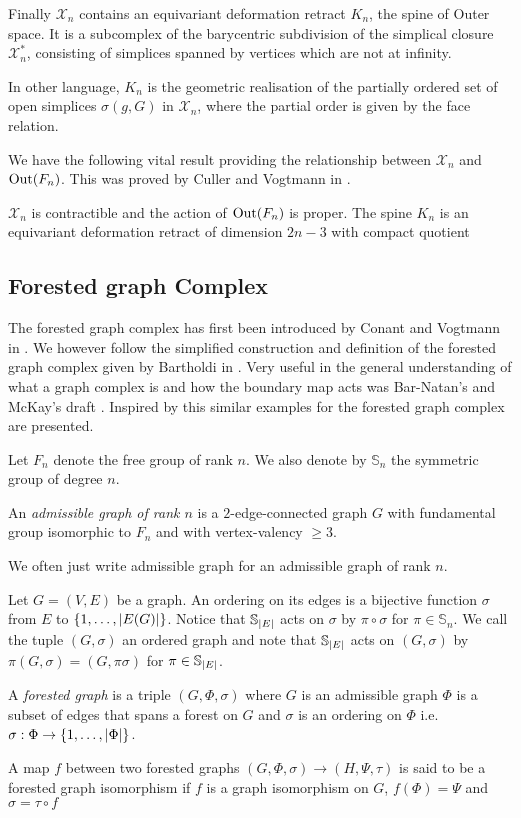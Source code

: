  Finally $\mathcal{X}_{n}$ contains an equivariant deformation retract $K_{n}$, the spine of Outer space.
 It is a subcomplex of the barycentric subdivision of the simplical closure $\mathcal{X}_{n}^{*}$, consisting of simplices spanned by vertices which are not at infinity.

 In other language, $K_{n}$ is the geometric realisation of the partially ordered set of open simplices $\sigma(g,G)$ in $\mathcal{X}_{n}$, where 
 the partial order is given by the face relation.

 We have the following vital result providing the relationship between $\mathcal{X}_{n}$ and $\operatorname{Out}(F_{n})$. This was proved by Culler and Vogtmann in \cite{vogtmann86}.
 \begin{theorem}
	 $\mathcal{X}_{n}$ is contractible and the action of $\operatorname{Out}(F_{n})$ is proper.
	 The spine $K_{n}$ is an equivariant deformation retract of dimension $2 n - 3$ with compact quotient
 \end{theorem}

\subsection{Forested graph Complex}
The forested graph complex has first been introduced by Conant and Vogtmann in \cite{conant03}.
We however follow the simplified construction and definition of the forested graph complex given by Bartholdi in \cite{bartholdi16}.
Very useful in the general understanding of  what a graph complex is and how the boundary map acts was Bar-Natan's and McKay's draft \cite{natan01}.
Inspired by this similar examples for the forested graph complex are presented.

Let $F_{n}$ denote the free group of rank $n$. We also denote by $\mathbb{S}_{n}$ the symmetric group of degree $n$.
\begin{definition}
	An \emph{admissible graph of rank $n$} is a $2$-edge-connected graph $G$ with fundamental group isomorphic to $F_{n}$ and with vertex-valency $\geq 3$.
\end{definition}

We often just write admissible graph for an admissible graph of rank $n$.

\begin{definition}
	Let $G = (V,E)$ be a graph. An ordering on its edges is a bijective function $\sigma$ from $E$ to $\{1,\ldots,\abs{E(G)}\}$.
	Notice that $\mathbb{S}_{\abs{E}}$ acts on $\sigma$ by $\pi \circ \sigma$ for $\pi \in \mathbb{S}_{n}$.
	We call the tuple $(G,\sigma)$ an ordered graph and note that $\mathbb{S}_{\abs{E}}$ acts on $(G,\sigma)$ by $\pi (G,\sigma) = (G,\pi \sigma)$ for $\pi \in \mathbb{S}_{\abs{E}}$.

	A \emph{forested graph} is a triple $(G,\Phi,\sigma)$ where $G$ is an admissible graph $\Phi$ is a subset of edges that spans a forest on $G$ and 
	$\sigma$ is an ordering on $\Phi$ i.e. $\sigma : \Phi \to \{1,\ldots,\abs{\Phi}\}$.

	A map $f$ between two forested graphs $(G,\Phi, \sigma) \to (H,\Psi, \tau)$ is said to be a forested graph isomorphism if 
	$f$ is a graph isomorphism on $G$,  $f(\Phi) = \Psi$ and $\sigma = \tau \circ f $
\end{definition}


